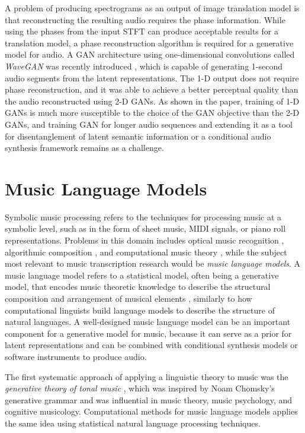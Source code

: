 A problem of producing spectrograms as an output of image translation model is that reconstructing the resulting audio requires the phase information.
While using the phases from the input STFT can produce acceptable results for a translation model, a phase reconstruction algorithm is required for a generative model for audio.
A GAN architecture using one-dimensional convolutions called \emph{WaveGAN} was recently introduced \cite{donahue2018wavegan}, which is capable of generating 1-second audio segments from the latent representations.
The 1-D output does not require phase reconstruction, and it was able to achieve a better perceptual quality than the audio reconstructed using 2-D GANs.
As shown in the paper, training of 1-D GANs is much more susceptible to the choice of the GAN objective than the 2-D GANs, and training GAN for longer audio sequences and extending it as a tool for disentanglement of latent semantic information or a conditional audio synthesis framework remains as a challenge.

\section{Music Language Models}

Symbolic music processing refers to the techniques for processing music at a symbolic level, such as in the form of sheet music, MIDI signals, or piano roll representations.
Problems in this domain includes optical music recognition \cite{rebelo2012omr}, algorithmic composition \cite{fernandez2013ai}, and computational music theory \cite{hamanaka2013computational}, while the subject most relevant to music transcription research would be \emph{music language models}.
A music language model refers to a statistical model, often being a generative model, that encodes music theoretic knowledge to describe the structural composition and arrangement of musical elements \cite{patel2010musiclanguage}, similarly to how computational linguists build language models to describe the structure of natural languages.
A well-designed music language model can be an important component for a generative model for music, because it can serve as a prior for latent representations and can be combined with conditional synthesis models or software instruments to produce audio.

The first systematic approach of applying a linguistic theory to music was the \emph{generative theory of tonal music} \cite{lerdahl1983gttm}, which was inspired by Noam Chomsky's generative grammar \cite{chomsky1966generative} and was influential in music theory, music psychology, and cognitive musicology.
Computational methods for music language models applies the same idea using statistical natural language processing techniques.

